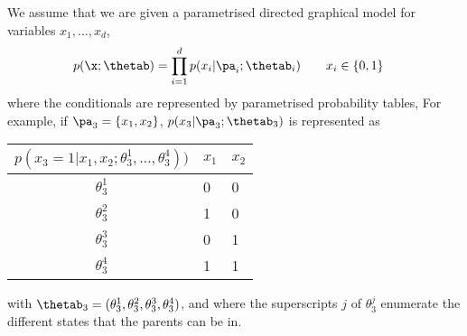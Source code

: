 
\label{ex:MLE-DGM}
We assume that we are given a parametrised directed graphical model for variables
$x_1, \ldots, x_d$, 
\begin{align}
  p(\x; \thetab) &= \prod_{i=1}^d p(x_i | \pa_i; \thetab_i) \quad \quad x_i \in \{0,1\} \label{eq:p-dag}
\end{align}
where the conditionals are represented by parametrised probability
tables, For example, if $\pa_3 = \{x_1, x_2\}$, $p(x_3 | \pa_3;
\thetab_3)$ is represented as

\begin{center}
  \begin{tabular}{@{}cll@{}}
      \toprule
      $p(x_3=1 | x_1, x_2; \theta^1_3, \ldots, \theta_3^4))$ & $x_1$ & $x_2$\\
      \midrule
      $\theta^1_3$ & 0 & 0\\
      $\theta^2_3$ & 1 & 0\\
      $\theta^3_3$ & 0 & 1\\
      $\theta^4_3$ & 1 & 1\\
      \bottomrule
  \end{tabular}
\end{center}
with $\thetab_3 = (\theta_3^1,\theta_3^2, \theta_3^3, \theta_3^4)$,
and where the superscripts $j$ of $\theta_3^j$ enumerate the different states
that the parents can be in.

